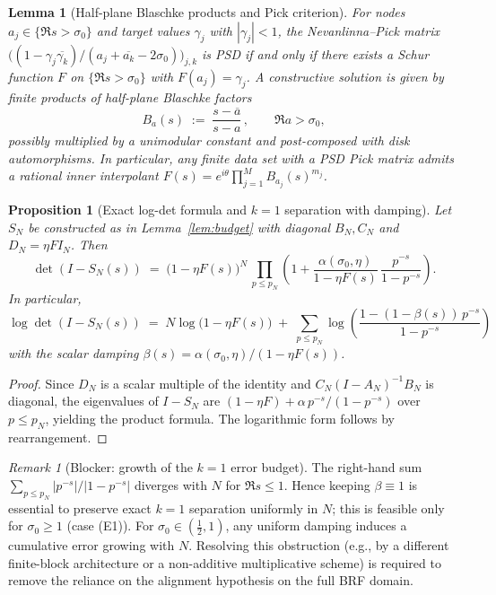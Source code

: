 \documentclass[11pt]{article}
\newtheorem{proposition}[theorem]{Proposition}
\newtheorem{lemma}[theorem]{Lemma}
\theoremstyle{definition}
\theoremstyle{remark}
\newtheorem{remark}[theorem]{Remark}
\begin{document}
\begin{lemma}[Half-plane Blaschke products and Pick criterion]\label{lem:halfplane-blaschke}
For nodes $a_j\in\{\Re s>\sigma_0\}$ and target values $\gamma_j$ with $|\gamma_j|<1$, the Nevanlinna--Pick matrix $\big((1-\gamma_j\overline{\gamma_k})/(a_j+\overline{a_k}-2\sigma_0)\big)_{j,k}$ is PSD if and only if there exists a Schur function $F$ on $\{\Re s>\sigma_0\}$ with $F(a_j)=\gamma_j$. A constructive solution is given by finite products of half-plane Blaschke factors
\[
 B_{a}(s)\;:=\;\frac{s-\overline a}{s-a}\,,\qquad \Re a>\sigma_0,
\]
possibly multiplied by a unimodular constant and post-composed with disk automorphisms. In particular, any finite data set with a PSD Pick matrix admits a rational inner interpolant $F(s)=e^{i\theta}\prod_{j=1}^{M} B_{a_j}(s)^{m_j}$.
\end{lemma}
\begin{proposition}[Exact log-det formula and $k=1$ separation with damping]\label{prop:logdet-S}
Let $S_N$ be constructed as in Lemma~\ref{lem:budget} with diagonal $B_N,C_N$ and $D_N=\eta F I_N$. Then
\[
 \det(I-S_N(s))\;=\;\big(1-\eta F(s)\big)^{N}\,\prod_{p\le p_N}\left(1+\frac{\alpha(\sigma_0,\eta)}{1-\eta F(s)}\,\frac{p^{-s}}{1-p^{-s}}\right).
\]
In particular,
\[
 \log\det(I-S_N(s))\;=\;N\log\big(1-\eta F(s)\big)\; +\; \sum_{p\le p_N}\log\left(\frac{1-(1-\beta(s))\,p^{-s}}{1-p^{-s}}\right)
\]
with the scalar damping $\beta(s)=\alpha(\sigma_0,\eta)/(1-\eta F(s))$.
\end{proposition}
\begin{proof}
Since $D_N$ is a scalar multiple of the identity and $C_N(I-A_N)^{-1}B_N$ is diagonal, the eigenvalues of $I-S_N$ are $(1-\eta F)+\alpha\, p^{-s}/(1-p^{-s})$ over $p\le p_N$, yielding the product formula. The logarithmic form follows by rearrangement.
\end{proof}
\begin{remark}[Blocker: growth of the $k=1$ error budget]
The right-hand sum $\sum_{p\le p_N} |p^{-s}|/|1-p^{-s}|$ diverges with $N$ for $\Re s\le 1$. Hence keeping $\beta\equiv 1$ is essential to preserve exact $k=1$ separation uniformly in $N$; this is feasible only for $\sigma_0\ge 1$ (case (E1)). For $\sigma_0\in(\tfrac12,1)$, any uniform damping induces a cumulative error growing with $N$. Resolving this obstruction (e.g., by a different finite-block architecture or a non-additive multiplicative scheme) is required to remove the reliance on the alignment hypothesis on the full BRF domain.
\end{remark}
\end{document}
